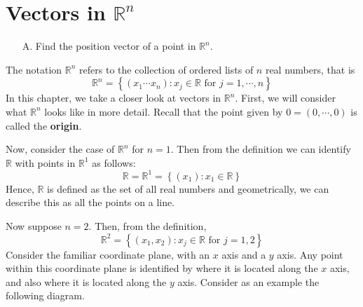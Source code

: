 \section{Vectors in $\mathbb{R}^n$}

\begin{outcome}

\begin{enumerate}
\item[A.] Find the position vector of a point in $\mathbb{R}^n$.
\end{enumerate}
\end{outcome}

The notation $\mathbb{R}^{n}$ refers to the collection of ordered lists of 
$n$ real numbers, that is 
\[
\mathbb{R}^{n} = \left\{ \left( x_{1}\cdots x_{n}\right)
:x_{j}\in \mathbb{R}\text{ for }j=1,\cdots ,n\right\}
\]
In this chapter, we take a closer look at vectors in $\mathbb{R}^n$. First, we will consider what $\mathbb{R}^n$ looks like 
in more detail. Recall that the point given by $0=\left( 0, \cdots, 0 \right)$ is called the \textbf{origin}.

Now, consider the case of $\mathbb{R}^n$ for $n=1.$ Then from the definition we can identify 
$\mathbb{R}$ with points in $\mathbb{R}^{1}$ as follows:
\begin{equation*}
\mathbb{R} = \mathbb{R}^{1}=
 \left\{ \left( x_{1}\right) :x_{1}\in \mathbb{R} \right\}
\end{equation*}
Hence, $\mathbb{R}$ is defined as the set of all real numbers and geometrically,
we can describe this as all the points on a line.

Now suppose $n=2$. Then, from the definition,
\begin{equation*}
\mathbb{R}^{2}=
\left\{ \left(x_{1}, x_{2}\right)
:x_{j}\in \mathbb{R}\text{ for }j=1,2 \right\}
\end{equation*}
Consider the
familiar coordinate plane, with an $x$ axis and a $y$ axis. Any point
within this coordinate plane is identified by where it is located
along the $x$ axis, and also where it is located along the $y$
axis. Consider as an example the following diagram.

\begin{center}
\end{center}

